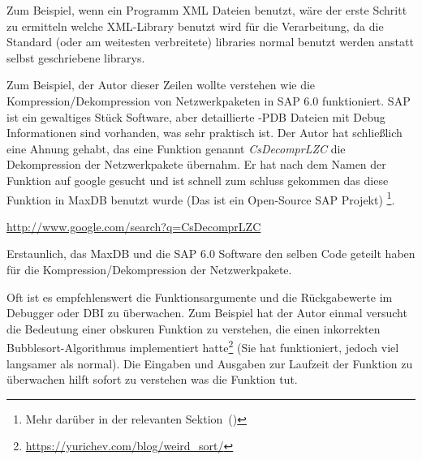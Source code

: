 Zum Beispiel, wenn ein Programm XML Dateien benutzt, w\"are der erste Schritt zu ermitteln welche
XML-Library benutzt wird f\"ur die Verarbeitung, da die Standard (oder am weitesten verbreitete) libraries
normal benutzt werden anstatt selbst geschriebene librarys.


Zum Beispiel, der Autor dieser Zeilen wollte verstehen wie die Kompression/Dekompression von Netzwerkpaketen in SAP 6.0 funktioniert.
SAP ist ein gewaltiges St\"uck Software, aber detaillierte -\gls{PDB} Dateien mit Debug Informationen sind vorhanden, was sehr praktisch 
ist. Der Autor hat schließlich eine Ahnung gehabt, das eine Funktion genannt \emph{CsDecomprLZC} die Dekompression der Netzwerkpakete \"ubernahm.
Er hat nach dem Namen der Funktion auf google gesucht und ist schnell zum schluss gekommen das diese Funktion in 
MaxDB benutzt wurde (Das ist ein Open-Source SAP Projekt) \footnote{Mehr dar\"uber in der relevanten Sektion~()}. 

\url{http://www.google.com/search?q=CsDecomprLZC}

Erstaunlich, das MaxDB und die SAP 6.0 Software den selben Code geteilt haben f\"ur die Kompression/Dekompression der Netzwerkpakete.

 

Oft ist es empfehlenswert die Funktionsargumente und die R\"uckgabewerte im
Debugger oder \ac{DBI} zu \"uberwachen. Zum Beispiel hat der Autor einmal
versucht die Bedeutung einer obskuren Funktion zu verstehen, die einen inkorrekten
Bubblesort-Algorithmus implementiert hatte\footnote{\url{https://yurichev.com/blog/weird_sort/}}
(Sie hat funktioniert, jedoch viel langsamer als normal). Die Eingaben und Ausgaben zur Laufzeit 
der Funktion zu \"uberwachen hilft sofort zu verstehen was die Funktion tut.













